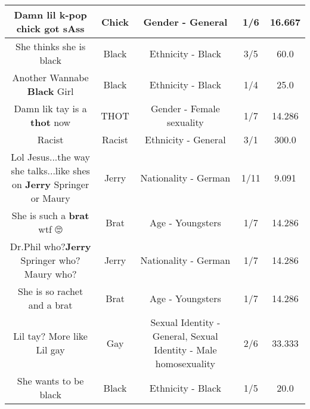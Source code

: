 \documentclass[11pt]{article}
\newlength\mylength
\begin{document}
\begin{center}
\begin{longtable}{|C{.65\mylength}|C{.30\mylength}|C{.12\mylength}|C{.12\mylength}|C{.12\mylength}|}
  \small Damn lil k-pop \textbf{chick} got sAss\normalsize   & Chick & Gender - General & 1/6 & 16.667 \\  \hline
  \small She thinks she is black\normalsize   & Black & Ethnicity - Black & 3/5 & 60.0 \\  \hline
  \small Another Wannabe \textbf{Black} Girl\normalsize   & Black & Ethnicity - Black & 1/4 & 25.0 \\  \hline
  \small Damn lik tay is a \textbf{thot} now\normalsize   & THOT & Gender - Female sexuality & 1/7 & 14.286 \\  \hline
  \small Racist\normalsize   & Racist & Ethnicity - General & 3/1 & 300.0 \\  \hline
  \small Lol Jesus...the way she talks...like shes on \textbf{Jerry} Springer or Maury\normalsize   & Jerry & Nationality - German & 1/11 & 9.091 \\  \hline
  \small She is such a \textbf{brat} wtf 🙄\normalsize   & Brat & Age - Youngsters & 1/7 & 14.286 \\  \hline
  \small Dr.Phil who?\textbf{Jerry} Springer who?Maury who?\normalsize   & Jerry & Nationality - German & 1/7 & 14.286 \\  \hline
  \small She is so rachet  and a brat\normalsize   & Brat & Age - Youngsters & 1/7 & 14.286 \\  \hline
  \small Lil tay? More like Lil gay\normalsize   & Gay & Sexual Identity - General, Sexual Identity - Male homosexuality & 2/6 & 33.333 \\  \hline
  \small She wants to be black\normalsize   & Black & Ethnicity - Black & 1/5 & 20.0 \\  \hline

\end{longtable}
\end{center}
\end{document}
